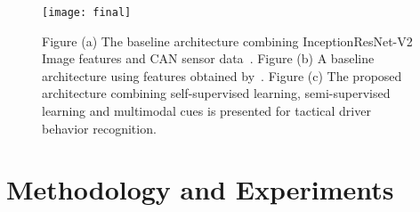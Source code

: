 \documentclass[10pt,twocolumn,letterpaper]{article}
\begin{document}





\setlength{\belowcaptionskip}{-10.5pt}

\begin{figure*}
\label{baseline2}
\begin{center}
\texttt{[image: final]}
   \caption{Figure (a) The baseline architecture combining InceptionResNet-V2 Image features and CAN sensor data~\cite{RamanishkaCVPR2018}. 
Figure (b) A baseline architecture using features obtained by~\cite{santana2016learning}. Figure (c) The proposed architecture combining self-supervised learning, semi-supervised learning and multimodal cues is presented for tactical driver behavior recognition.}
\end{center}   
\end{figure*}



\section{Methodology and Experiments}
 
\end{document}
